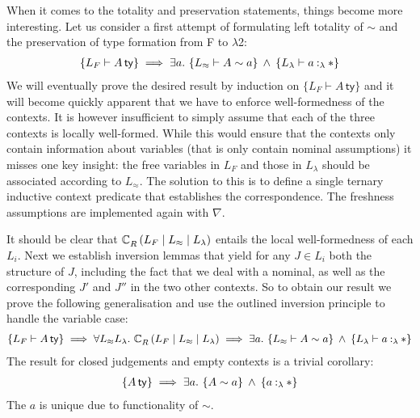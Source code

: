 \documentclass[a4paper,UKenglish]{lipics-v2016}
\newcommand{\ms}{\,}
\newcommand{\mrel}[1]{\mathrel{\ms #1 \ms}}
\newcommand{\mAnd}{\mrel{\wedge}}
\newcommand{\mAll}[1]{\ensuremath{\forall} #1.\ms\ms}
\newcommand{\mEx}[1]{\ensuremath{\exists} #1.\ms\ms}
\newcommand{\SysL}{$\lambda$2\xspace}
\newcommand{\istyFh}[1]{\ensuremath{#1\ms\mathsf{ty}}}
\newcommand{\typingFh}[2]{\ensuremath{#1 \mathbin{:_{F}} #2}}
\newcommand{\typingLh}[2]{\ensuremath{#1 \mathbin{:_{\lambda}} #2}}
\newcommand{\tyr}{\mathrel{\sim}}
\newcommand{\tmr}{\mathrel{\approx}}
\newcommand{\Prp}{\ensuremath{\textrm{\textasteriskcentered}}}
\newcommand{\emptyctx}{\ensuremath{\bullet}}
\begin{document}
When it comes to the totality and preservation statements, things become more interesting.
Let us consider a first attempt of formulating left totality of $\tyr$ and the preservation of type formation from F to \SysL:
\begin{align*}
  \{L_{F} \vdash \istyFh{A}\} \implies \mEx{a} \{ L_{\tmr} \vdash A \tyr a \} \mAnd \{L_{\lambda} \vdash \typingLh{a}{\Prp}\}
\end{align*}
We will eventually prove the desired result by induction on $\{L_{F} \vdash \istyFh{A}\}$ and it will become quickly apparent that we have to enforce well-formedness of the contexts.
It is however insufficient to simply assume that each of the three contexts is locally well-formed.
While this would ensure that the contexts only contain information about variables (that is only contain nominal assumptions) it misses one key insight: the free variables in $L_{F}$ and those in $L_{\lambda}$ should be associated according to $L_{\tmr}$.
The solution to this is to define a single ternary inductive context predicate that establishes the correspondence.
The freshness assumptions are implemented again with $\nabla$.
\newcommand{\acR}[3]{\ac{R}{~}{#1 \mid #2 \mid #3}}
It should be clear that $\acR{L_{F}}{L_{\tmr}}{L_{\lambda}}$ entails the local well-formedness of each $L_i$.
Next we establish inversion lemmas that yield for any $J \in L_i$ both the structure of $J$, including the fact that we deal with a nominal, as well as the corresponding $J'$ and $J''$ in the two other contexts.
So to obtain our result we prove the following generalisation and use the outlined inversion principle to handle the variable case:
\begin{align*}
  \{L_{F} \vdash \istyFh{A}\} \implies \mAll{L_{\tmr}L_{\lambda}} \acR{L_{F}}{L_{\tmr}}{L_{\lambda}} \implies \mEx{a} \{ L_{\tmr} \vdash A \tyr a \} \mAnd \{L_{\lambda} \vdash \typingLh{a}{\Prp}\}
\end{align*}
The result for closed judgements and empty contexts is a trivial corollary:
\begin{align*}
  \{\istyFh{A}\} \implies \mEx{a} \{ A \tyr a \} \mAnd \{\typingLh{a}{\Prp}\}
\end{align*}
The $a$ is unique due to functionality of $\tyr$.
\end{document}
